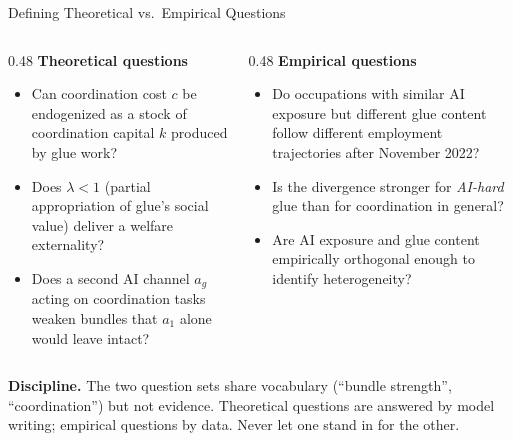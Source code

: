 \documentclass[10pt,english,aspectratio=169]{beamer}
\begin{document}
\begin{frame}{Defining Theoretical vs.\ Empirical Questions}
\begin{columns}[T]
\begin{column}{0.48\textwidth}
\textbf{Theoretical questions}
\begin{itemize}\small
  \item Can coordination cost $c$ be endogenized as a stock of coordination capital $k$ produced by glue work?
  \item Does $\lambda<1$ (partial appropriation of glue's social value) deliver a welfare externality?
  \item Does a second AI channel $a_g$ acting on coordination tasks weaken bundles that $a_1$ alone would leave intact?
\end{itemize}
\end{column}
\begin{column}{0.48\textwidth}
\textbf{Empirical questions}
\begin{itemize}\small
  \item Do occupations with similar AI exposure but different glue content follow different employment trajectories after November 2022?
  \item Is the divergence stronger for \emph{AI-hard} glue than for coordination in general?
  \item Are AI exposure and glue content empirically orthogonal enough to identify heterogeneity?
\end{itemize}
\end{column}
\end{columns}

\vspace{0.25cm}
\begin{tcolorbox}[colback=blue!3,colframe=RedTitle!60]
\textbf{Discipline.} The two question sets share vocabulary (``bundle strength'', ``coordination'') but not evidence. Theoretical questions are answered by model writing; empirical questions by data. Never let one stand in for the other.
\end{tcolorbox}
\end{frame}
\end{document}
